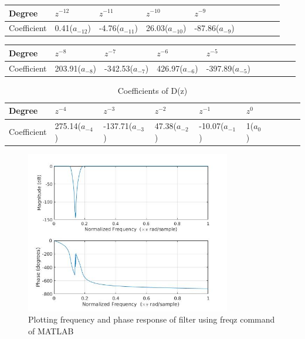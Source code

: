 \documentclass[12pt]{article}
\begin{document}
\begin{table}[h!]
\centering
\begin{tabular}{|l|l|l|l|l|l|l|l|l|l|}\hline
Degree & $z^{-12}$ & $z^{-11}$ & $z^{-10}$ & $z^{-9}$ \\ \hline
Coefficient &  0.41($a_{-12}$) &  -4.76($a_{-11}$) &  26.03($a_{-10}$) & -87.86($a_{-9}$) \\\hline
\end{tabular}
\end{table}
\begin{table}[h!]
\centering
\begin{tabular}{|l|l|l|l|l|l|l|l|l|l|}
\hline
Degree & $z^{-8}$ & $z^{-7}$ & $z^{-6}$ & $z^{-5}$ \\ \hline
Coefficient & 203.91($a_{-8}$) & -342.53($a_{-7}$) &  426.97($a_{-6}$) &  -397.89($a_{-5}$) \\\hline
\end{tabular}
\end{table}
\begin{table}[h!]
\centering
\begin{tabular}{|l|l|l|l|l|l|l|l|l|l|}
\hline
Degree & $z^{-4}$ & $z^{-3}$ & $z^{-2}$ & $z^{-1}$& $z^{0}$ \\ \hline
Coefficient & 275.14($a_{-4}$) &  -137.71($a_{-3}$) & 47.38($a_{-2}$) &  -10.07($a_{-1}$) & 1($a_{0}$) \\\hline
\end{tabular}
\caption{\label{tab:widgets}Coefficients of D(z)}
\end{table}

\begin{figure}[h!]
	\centering	
	\includegraphics[width = 0.8\textwidth]{matlab_filter2.jpg}
    \caption{Plotting frequency and phase response of filter using freqz command of MATLAB}
\end{figure}
\newpage
\newpage
\end{document}
